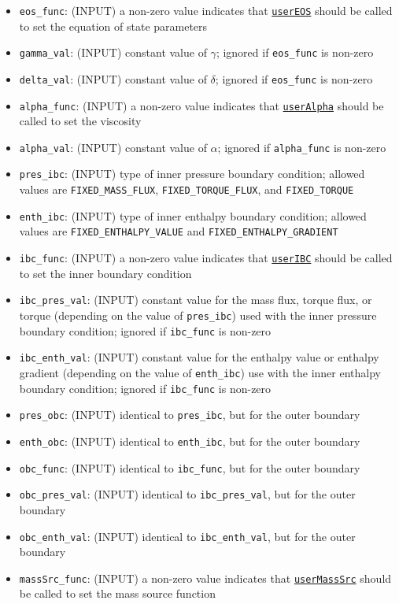 \documentclass[12pt]{article}
\begin{document}
\begin{itemize}
\item \verb=eos_func=: (INPUT) a non-zero value indicates that \hyperref[sssec:userEOS]{\texttt{userEOS}} should be called to set the equation of state parameters
\item \verb=gamma_val=: (INPUT) constant value of $\gamma$; ignored if \verb=eos_func= is non-zero
\item \verb=delta_val=: (INPUT) constant value of $\delta$; ignored if \verb=eos_func= is non-zero
\item \verb=alpha_func=: (INPUT) a non-zero value indicates that \hyperref[sssec:userAlpha]{\texttt{userAlpha}} should be called to set the viscosity
\item \verb=alpha_val=: (INPUT) constant value of $\alpha$; ignored if \verb=alpha_func= is non-zero
\item \verb=pres_ibc=: (INPUT) type of inner pressure boundary condition; allowed values are \verb=FIXED_MASS_FLUX=, \verb=FIXED_TORQUE_FLUX=, and \verb=FIXED_TORQUE=
\item \verb=enth_ibc=: (INPUT) type of inner enthalpy boundary condition; allowed values are \verb=FIXED_ENTHALPY_VALUE= and \verb=FIXED_ENTHALPY_GRADIENT=
\item \verb=ibc_func=: (INPUT) a non-zero value indicates that \hyperref[sssec:userIBC]{\texttt{userIBC}} should be called to set the inner boundary condition
\item \verb=ibc_pres_val=: (INPUT) constant value for the mass flux, torque flux, or torque (depending on the value of \verb=pres_ibc=) used with the inner pressure boundary condition; ignored if \verb=ibc_func= is non-zero
\item \verb=ibc_enth_val=: (INPUT) constant value for the enthalpy value or enthalpy gradient (depending on the value of \verb=enth_ibc=) use with the inner enthalpy boundary condition; ignored if \verb=ibc_func= is non-zero
\item \verb=pres_obc=: (INPUT) identical to \verb=pres_ibc=, but for the outer boundary
\item \verb=enth_obc=: (INPUT) identical to \verb=enth_ibc=, but for the outer boundary
\item \verb=obc_func=: (INPUT) identical to \verb=ibc_func=, but for the outer boundary
\item \verb=obc_pres_val=: (INPUT) identical to \verb=ibc_pres_val=, but for the outer boundary
\item \verb=obc_enth_val=: (INPUT) identical to \verb=ibc_enth_val=, but for the outer boundary
\item \verb=massSrc_func=: (INPUT) a non-zero value indicates that \hyperref[sssec:userMassSrc]{\texttt{userMassSrc}} should be called to set the mass source function

\end{itemize}
\end{document}
